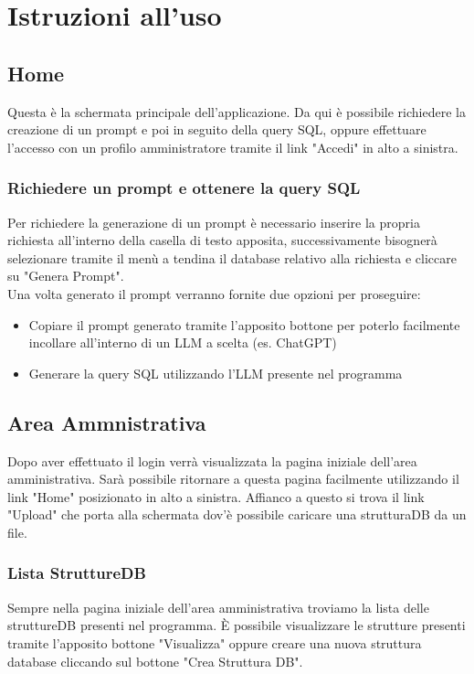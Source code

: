 \documentclass[5pt]{article}
\begin{document}
    \section{Istruzioni all'uso}
    
	    \subsection{Home}
	    Questa è la schermata principale dell'applicazione. Da qui è possibile richiedere la creazione di un prompt e poi in seguito della query SQL, oppure effettuare l'accesso con un profilo amministratore tramite il link "Accedi" in alto a sinistra.
	    
	    \subsubsection{Richiedere un prompt e ottenere la query SQL}
	    Per richiedere la generazione di un prompt è necessario inserire la propria richiesta all'interno della casella di testo apposita, successivamente bisognerà selezionare tramite il menù a tendina il database relativo alla richiesta e cliccare su "Genera Prompt".\\
	    Una volta generato il prompt verranno fornite due opzioni per proseguire:
	    \begin{itemize}
	    	\item Copiare il prompt generato tramite l'apposito bottone per poterlo facilmente incollare all'interno di un LLM a scelta (es. ChatGPT)
	    	\item Generare la query SQL utilizzando l'LLM presente nel programma %
	    \end{itemize} 
	    
	    
	    \subsection{Area Ammnistrativa}
	    Dopo aver effettuato il login verrà visualizzata la pagina iniziale dell'area amministrativa. Sarà possibile ritornare a questa pagina facilmente utilizzando il link "Home" posizionato in alto a sinistra. Affianco a questo si trova il link "Upload" che porta alla schermata dov'è possibile caricare una strutturaDB da un file.
	    
	    \subsubsection{Lista StruttureDB}
	    Sempre nella pagina iniziale dell'area amministrativa troviamo la lista delle struttureDB presenti nel programma. È possibile visualizzare le strutture presenti tramite l'apposito bottone "Visualizza" oppure creare una nuova struttura database cliccando sul bottone "Crea Struttura DB". 
	    
\end{document}
